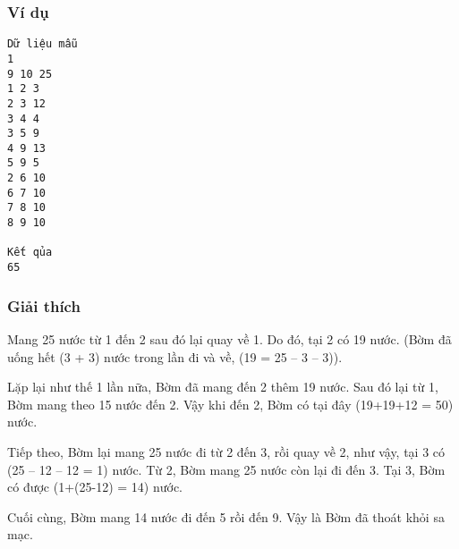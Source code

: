 \subsubsection{Ví dụ}
\begin{verbatim}
Dữ liệu mẫu
1
9 10 25 
1 2 3 
2 3 12 
3 4 4 
3 5 9 
4 9 13 
5 9 5 
2 6 10 
6 7 10 
7 8 10 
8 9 10 

Kết qủa
65 
\end{verbatim}

\subsubsection{Giải thích}

Mang 25 nước từ 1 đến 2 sau đó lại quay về 1. Do đó, tại 2 có 19 nước. (Bờm đã uống hết (3 + 3) nước trong lần đi và về, (19 = 25 – 3 – 3)).

Lặp lại như thế 1 lần nữa, Bờm đã mang đến 2 thêm 19 nước. Sau đó lại từ 1, Bờm mang theo 15 nước đến 2. Vậy khi đến 2, Bờm có tại đây (19+19+12 = 50) nước.

Tiếp theo, Bờm lại mang 25 nước đi từ 2 đến 3, rồi quay về 2, như vậy, tại 3 có (25 – 12 – 12 = 1) nước. Từ 2, Bờm mang 25 nước còn lại đi đến 3. Tại 3, Bờm có được (1+(25-12) = 14) nước.

Cuối cùng, Bờm mang 14 nước đi đến 5 rồi đến 9. Vậy là Bờm đã thoát khỏi sa mạc.
